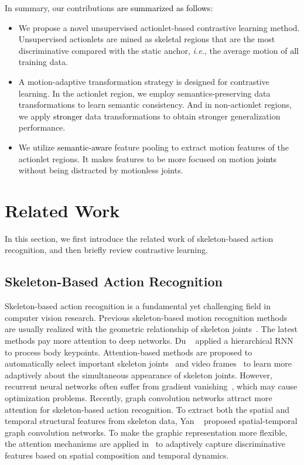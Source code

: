 \documentclass[twocolumn]{article}
\newcommand{\wh}[1]{\textcolor{black}{#1}}
\begin{document}
In summary, our contributions \wh{are summarized as follows}:
\begin{itemize}\setlength\itemsep{.3em}
\item We propose a novel unsupervised actionlet-based contrastive learning method. Unsupervised actionlets are mined as skeletal regions that are the most discriminative compared with the static anchor, \textit{i.e.}, the average motion of \wh{all} training data.
\item A motion-adaptive transformation strategy is designed for contrastive learning. In the actionlet region, we employ semantics-preserving data transformations to learn semantic consistency. And in non-actionlet regions, we apply \wh{stronger} data transformations to obtain stronger generalization performance.
\item We utilize \wh{semantic-aware} feature pooling to extract motion features of the actionlet regions. It makes features to be more focused on motion \wh{joints} without being distracted by motionless joints.
\end{itemize}

\section{Related Work}
In this section, we first introduce the related work of skeleton-based action recognition, and then briefly review contrastive learning.

\subsection{Skeleton-Based Action Recognition}
Skeleton-based action recognition is a fundamental yet challenging field in computer vision research. Previous skeleton-based motion recognition methods are usually realized with the geometric relationship of skeleton joints~\cite{vemulapalli2014human,vemulapalli2016rolling,goutsu2015motion}. The latest methods pay more attention to deep networks. Du \etal~\cite{du2015hierarchical} applied a hierarchical RNN to process body keypoints. 
Attention-based methods are proposed to automatically select important skeleton joints~\cite{song2017end,zhang2018adding,song2018spatio,si2019attention} and video frames~\cite{song2017end,song2018spatio} to learn more adaptively about the simultaneous appearance of skeleton joints. However, recurrent neural networks often suffer from gradient vanishing~\cite{hochreiter2001gradient}, which may cause optimization problems. Recently, graph convolution networks attract more attention for skeleton-based action recognition. To extract both the spatial and temporal structural features from skeleton data, Yan \etal~\cite{yan2018spatial} proposed spatial-temporal graph convolution networks. To make the graphic representation more flexible, the attention mechanisms are applied in~\cite{si2019attention,shi2019two,chen2021channel} to adaptively capture discriminative features based on spatial composition and temporal dynamics.
\end{document}
